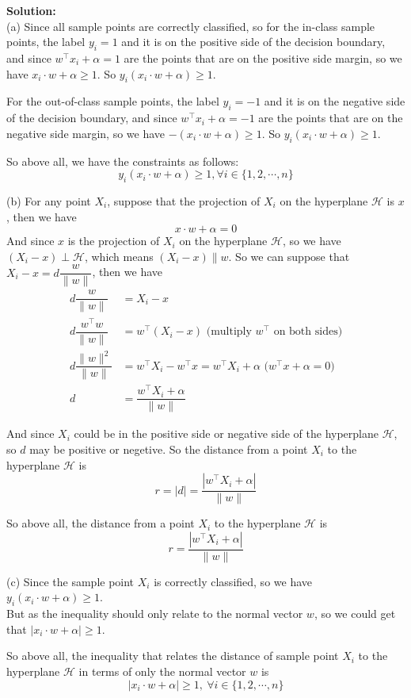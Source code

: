 \documentclass[10pt]{article}
\begin{document}
\begin{enumerate}[1.]
\textbf{Solution:}\\
(a) Since all sample points are correctly classified, so for the in-class sample points, the label $y_i=1$ and it is on the 
positive side of the decision boundary, and since $w^{\top}x_i+\alpha=1$ are the points that are on the positive side margin, 
so we have $x_i\cdot w+\alpha\geq 1$.
So $y_i(x_i\cdot w+\alpha)\geq 1$.

For the out-of-class sample points, the label $y_i=-1$ and it is on the negative side of the decision boundary, and since $w^{\top}x_i+\alpha=-1$ are the points that are on the negative side margin, 
so we have $-(x_i\cdot w+\alpha)\geq 1$.
So $y_i(x_i\cdot w+\alpha)\geq 1$.

So above all, we have the constraints as follows:
$$y_i(x_i\cdot w+\alpha)\geq 1, \forall i\in\{1,2,\cdots,n\}$$

(b) For any point $X_i$, suppose that the projection of $X_i$ on the hyperplane $\mathcal{H}$ is $x$, then we have
$$x\cdot w+\alpha=0$$
And since $x$ is the projection of $X_i$ on the hyperplane $\mathcal{H}$, so we have $(X_i-x)\perp \mathcal{H}$, which means
$(X_i-x) \parallel w$. So we can suppose that $X_i-x=d \dfrac{w}{\|w\|}$, then we have
\begin{align*}
  d \dfrac{w}{\|w\|}&=X_i - x \\
  d \dfrac{w^{\top}w}{\|w\|}&=w^{\top}(X_i - x)  \text{ (multiply $w^{\top}$ on both sides)} \\
  d \dfrac{\|w\|^2}{\|w\|}&=w^{\top}X_i - w^{\top}x = w^{\top}X_i + \alpha \text{ ($w^{\top}x+\alpha=0$)} \\
  d &= \dfrac{w^{\top}X_i + \alpha}{\|w\|}
\end{align*}

And since $X_i$ could be in the positive side or negative side of the hyperplane $\mathcal{H}$, so $d$ may be positive or negetive.
So the distance from a point $X_i$ to the hyperplane $\mathcal{H}$ is
$$r = |d| = \dfrac{|w^{\top}X_i + \alpha|}{\|w\|}$$

So above all, the distance from a point $X_i$ to the hyperplane $\mathcal{H}$ is
$$r = \dfrac{|w^{\top}X_i + \alpha|}{\|w\|}$$

(c) Since the sample point $X_i$ is correctly classified, so we have $y_i(x_i\cdot w+\alpha)\geq 1$.\\
But as the inequality should only relate to the normal vector $w$, so we could get that $|x_i\cdot w+\alpha|\geq 1$.

So above all, the inequality that relates the distance of sample point $X_i$ to the hyperplane $\mathcal{H}$ in terms of only the normal vector $w$ is
$$|x_i\cdot w+\alpha|\geq 1,\ \forall i\in\{1,2,\cdots,n\}$$


\end{enumerate}
\end{document}
